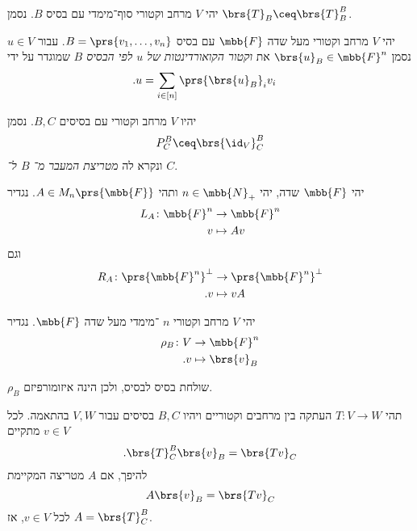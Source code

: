 \documentclass[a4paper,10pt,oneside,openany]{article}
\begin{document}
\begin{notation}
יהי
$V$
מרחב וקטורי סוף־מימדי עם בסיס
$B$.
נסמן
$\brs{T}_B \ceq \brs{T}^B_B$.
\end{notation}

\begin{definition}
יהי
$V$
מרחב וקטורי מעל שדה
$\mbb{F}$
עם בסיס
$B = \prs{v_1, \ldots, v_n}$.
עבור
$u \in V$
נסמן
$\brs{u}_B \in \mbb{F}^n$
את
\emph{וקטור הקואורדינטות של
$u$
לפי הבסיס
$B$}
שמוגדר על ידי
\begin{align*}
\text{.} u &= \sum_{i \in [n]} \prs{\brs{u}_B}_i v_i
\end{align*}
\end{definition}

\begin{definition}
יהיו
$V$
מרחב וקטורי
עם בסיסים
$B,C$.
נסמן
\[P^B_C \ceq \brs{\id_V}^B_C\]
ונקרא לה
\emph{מטריצת המעבר מ־%
$B$
ל־%
$C$}.
\end{definition}

\begin{definition}
יהי
$\mbb{F}$
שדה, יהי
$n \in \mbb{N}_+$
ותהי
$A \in M_n\prs{\mbb{F}}$.
נגדיר
\begin{align*}
L_A \colon \mbb{F}^n &\to \mbb{F}^n \\
v &\mapsto Av
\end{align*}
וגם
\begin{align*}
R_A \colon \prs{\mbb{F}^n}^\perp &\to \prs{\mbb{F}^n}^\perp \\
\text{.} v &\mapsto vA
\end{align*}
\end{definition}

\begin{definition}
יהי
$V$
מרחב וקטורי
$n$%
־מימדי מעל שדה
$\mbb{F}$.
נגדיר
\begin{align*}
\rho_B \colon V &\to \mbb{F}^n \\
\text{.} v &\mapsto \brs{v}_B
\end{align*}
\end{definition}

\begin{remark}
$\rho_B$
שולחת בסיס לבסיס, ולכן הינה איזומורפיזם.
\end{remark}

\begin{exercisex}
תהי
$T \colon V \to W$
העתקה בין מרחבים וקטוריים ויהיו
$B,C$
בסיסים עבור
$V,W$
בהתאמה.
לכל
$v \in V$
מתקיים
\[ \text{.} \brs{T}^B_C \brs{v}_B = \brs{Tv}_C\]
להיפך, אם
$A$
מטריצה המקיימת
\[  A \brs{v}_B = \brs{Tv}_C\]
לכל
$v \in V$,
אז
$A = \brs{T}_C^B$.
\end{exercisex}
\end{document}
